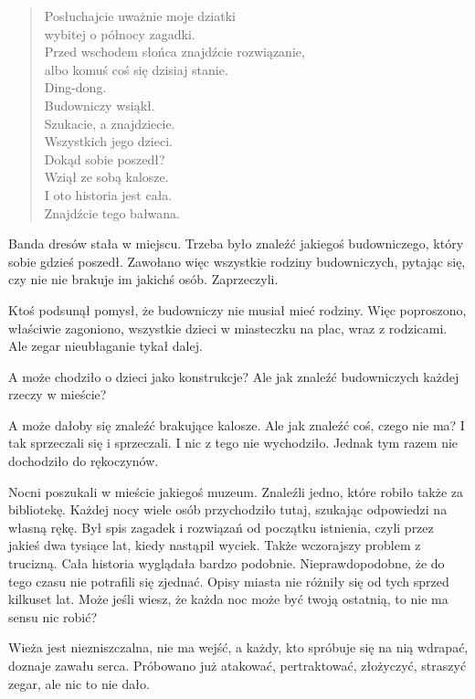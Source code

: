\begin{sl}
\begin{quote}
Posłuchajcie uważnie moje dziatki \\
wybitej o północy zagadki. \\
Przed wschodem słońca znajdźcie rozwiązanie, \\
albo komuś coś się dzisiaj stanie. \\
Ding-dong. \\
Budowniczy wsiąkł. \\
Szukacie, a znajdziecie. \\
Wszystkich jego dzieci. \\
Dokąd sobie poszedł? \\
Wziął ze sobą kalosze. \\
I oto historia jest cała. \\
Znajdźcie tego bałwana. \\
\end{quote}
\end{sl}

Banda dresów stała w miejscu.
Trzeba było znaleźć jakiegoś budowniczego, który sobie gdzieś poszedł.
Zawołano więc wszystkie rodziny budowniczych, pytając się, czy nie nie brakuje im jakichś osób.
Zaprzeczyli.

Ktoś podsunął pomysł, że budowniczy nie musiał mieć rodziny.
Więc poproszono, właściwie zagoniono, wszystkie dzieci w miasteczku na plac, wraz z rodzicami.
Ale zegar nieubłaganie tykał dalej.

A może chodziło o dzieci jako konstrukcje? Ale jak znaleźć budowniczych każdej rzeczy w mieście?

A może dałoby się znaleźć brakujące kalosze. Ale jak znaleźć coś, czego nie ma?
I tak sprzeczali się i sprzeczali.
I nic z tego nie wychodziło.
Jednak tym razem nie dochodziło do rękoczynów.

Nocni poszukali w mieście jakiegoś muzeum.
Znaleźli jedno, które robiło także za bibliotekę.
Każdej nocy wiele osób przychodziło tutaj, szukając odpowiedzi na własną rękę.
Był spis zagadek i rozwiązań od początku istnienia, czyli przez jakieś dwa tysiące lat, kiedy nastąpił wyciek.
Także wczorajszy problem z trucizną. Cała historia wyglądała bardzo podobnie.
Nieprawdopodobne, że do tego czasu nie potrafili się zjednać.
Opisy miasta nie różniły się od tych sprzed kilkuset lat.
Może jeśli wiesz, że każda noc może być twoją ostatnią, to nie ma sensu nic robić?

Wieża jest niezniszczalna, nie ma wejść, a każdy, kto spróbuje się na nią wdrapać, doznaje zawału serca.
Próbowano już atakować, pertraktować, złożyczyć, straszyć zegar, ale nic to nie dało.

